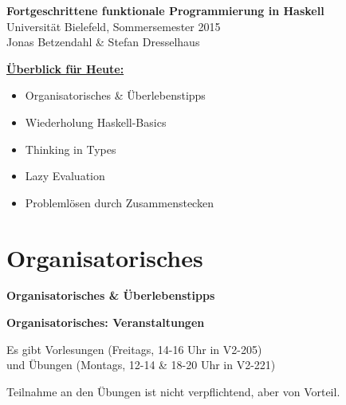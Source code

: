 \documentclass[unknownkeysallowed]{beamer}
\begin{document}
 
  

  \begin{frame}
    \huge\textbf{Fortgeschrittene funktionale Programmierung in Haskell}\\ \bigskip
    \LARGE Universität Bielefeld, Sommersemester 2015\\ \bigskip
    \large Jonas Betzendahl \& Stefan Dresselhaus
  \end{frame}

  
\begin{frame}
	\Large\textbf{\underline{Überblick für Heute:}}\bigskip \normalsize
	
	\begin{itemize}
	\item Organisatorisches \& Überlebenstipps
	\item Wiederholung Haskell-Basics
	\item Thinking in Types
	\item Lazy Evaluation
	\item Problemlösen durch Zusammenstecken
	\end{itemize}

\end{frame}

  \section{Organisatorisches}
  
  \begin{frame}

    \begin{center}
    \Large\textbf{Organisatorisches \& Überlebenstipps}
    \end{center}
  \end{frame}

  
  \begin{frame}
    \Large\textbf{Organisatorisches: Veranstaltungen}\bigskip \normalsize
    
    Es gibt Vorlesungen (Freitags, 14-16 Uhr in V2-205)\\
    und Übungen (Montags, 12-14 \& 18-20 Uhr in V2-221)\bigskip
	
	Teilnahme an den Übungen ist nicht verpflichtend, aber von Vorteil.  
  \end{frame}
  
\end{document}
